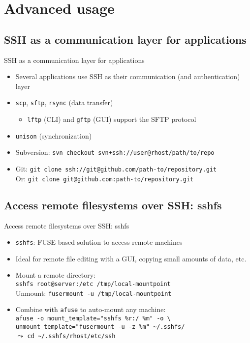 \documentclass[11pt,final,usepdftitle=false]{beamer}
\newcommand{\tilda}{\textasciitilde{}}
\begin{document}
\section{Advanced usage}

\subsection{SSH as a communication layer for applications}
\begin{frame}{SSH as a communication layer for applications}
	\begin{itemize}
		\item Several applications use SSH as their communication (and authentication) layer
		\hbr
		\item \texttt{scp}, \texttt{sftp}, \texttt{rsync} (data transfer)
			\begin{itemize}
				\item \texttt{lftp} (CLI) and \texttt{gftp} (GUI) support the SFTP protocol
			\end{itemize}
			\hbr
		\item \texttt{unison} (synchronization)
		\hbr

	\item \alert{Subversion:} \texttt{svn checkout svn+ssh://user@rhost/path/to/repo}
		\hbr
	\item \alert{Git:} \texttt{git clone ssh://git@github.com/path-to/repository.git}\\
	 Or: \texttt{git clone git@github.com:path-to/repository.git}
	\end{itemize}
\end{frame}

\subsection{Access remote filesystems over SSH: sshfs}
\begin{frame}[fragile]{Access remote filesystems over SSH: sshfs}
	\begin{itemize}
		\item \texttt{sshfs}: FUSE-based solution to access remote machines
			\hbr
	\item Ideal for remote file editing with a GUI, copying small amounts of data, etc.
			\hbr
		\item Mount a remote directory:\\
			\texttt{sshfs root@server:/etc /tmp/local-mountpoint}\\
			Unmount: \texttt{fusermount -u /tmp/local-mountpoint}
		\hbr
	\item Combine with \texttt{afuse} to auto-mount any machine:\\
	 \texttt{afuse -o mount\_template="sshfs \%r:/ \%m" -o \textbackslash \\
	 unmount\_template="fusermount -u -z \%m" \tilda/.sshfs/}\\[0.5em]
			$\leadsto$ \texttt{cd \tilda/.sshfs/rhost/etc/ssh}
	\end{itemize}
\end{frame}
\end{document}

